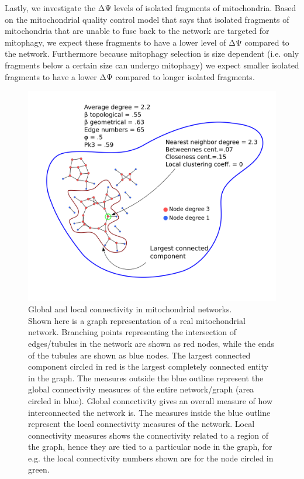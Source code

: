 Lastly, we investigate the ΔΨ levels of isolated fragments of mitochondria. Based on the mitochondrial quality control model that says that isolated fragments of mitochondria that are unable to fuse back to the network are targeted for mitophagy, we expect these fragments to have a lower level of ΔΨ compared to the network. Furthermore because mitophagy selection is size dependent (i.e. only fragments below a certain size can undergo mitophagy) \cite{kanki_mitophagy_2008,rambold_tubular_2011} we expect smaller isolated fragments to have a lower ΔΨ compared to longer isolated fragments.
%
\begin{figure}[htp]
	\centering
    \includegraphics[width=.95\textwidth]{graph}
    \caption[Global and local connectivity in mitochondrial networks]{Global and local connectivity in mitochondrial networks.\\Shown here is a graph representation of a real mitochondrial network. Branching points representing the intersection of edges/tubules in the network are shown as red nodes, while the ends of the tubules are shown as blue nodes. The largest connected component circled in red is the largest completely connected entity in the graph. The measures outside the blue outline represent the global connectivity measures of the entire network/graph (area circled in blue). Global connectivity gives an overall measure of how interconnected the network is. The measures inside the blue outline represent the local connectivity measures of the network. Local connectivity measures shows the connectivity related to a region of the graph, hence they are tied to a particular node in the graph, for e.g. the local connectivity numbers shown are for the node circled in green.}\label{fig:graph}
\end{figure}
%
